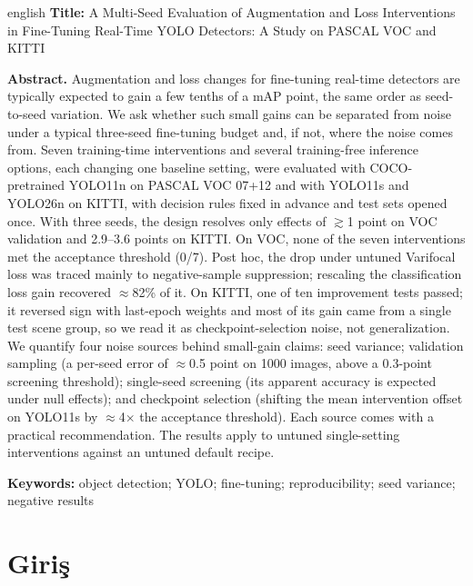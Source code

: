 \documentclass[pdflatex,iicol,sn-mathphys-num]{sn-jnl}
\newcommand{\ingilizceblok}[3]{\par\medskip
  \begin{otherlanguage*}{english}%
  \noindent\textbf{Title:} #1\par\medskip
  \noindent\textbf{Abstract.} #2\par\medskip
  \noindent\textbf{Keywords:} #3%
  \end{otherlanguage*}}
\begin{document}
\maketitle

{\small\ingilizceblok{A Multi-Seed Evaluation of Augmentation and Loss Interventions in Fine-Tuning Real-Time YOLO Detectors: A Study on PASCAL VOC and KITTI}{Augmentation and loss changes for fine-tuning real-time detectors are typically expected to gain a few tenths of a mAP point, the same order as seed-to-seed variation. We ask whether such small gains can be separated from noise under a typical three-seed fine-tuning budget and, if not, where the noise comes from. Seven training-time interventions and several training-free inference options, each changing one baseline setting, were evaluated with COCO-pretrained YOLO11n on PASCAL VOC 07+12 and with YOLO11s and YOLO26n on KITTI, with decision rules fixed in advance and test sets opened once. With three seeds, the design resolves only effects of $\gtrsim$1 point on VOC validation and 2.9--3.6 points on KITTI. On VOC, none of the seven interventions met the acceptance threshold (0/7). Post hoc, the drop under untuned Varifocal loss was traced mainly to negative-sample suppression; rescaling the classification loss gain recovered $\approx$82\% of it. On KITTI, one of ten improvement tests passed; it reversed sign with last-epoch weights and most of its gain came from a single test scene group, so we read it as checkpoint-selection noise, not generalization. We quantify four noise sources behind small-gain claims: seed variance; validation sampling (a per-seed error of $\approx$0.5 point on 1000 images, above a 0.3-point screening threshold); single-seed screening (its apparent accuracy is expected under null effects); and checkpoint selection (shifting the mean intervention offset on YOLO11s by $\approx$4$\times$ the acceptance threshold). Each source comes with a practical recommendation. The results apply to untuned single-setting interventions against an untuned default recipe.}{object detection; YOLO; fine-tuning; reproducibility; seed variance; negative results}\par}

\section{Giriş}\label{sec:giris}
\end{document}
